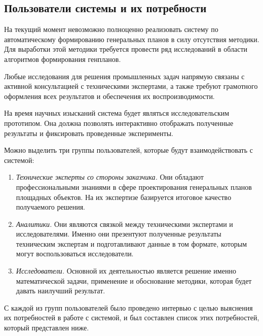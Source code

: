 \subsection{\Large{Пользователи системы и их потребности}}

На текущий момент невозможно полноценно реализовать систему по автоматическому
формированию генеральных планов в силу отсутствия методики.
Для выработки этой методики требуется провести ряд исследований в области
алгоритмов формирования генпланов.

Любые исследования для решения промышленных задач напрямую связаны с активной консультацией
с техническими экспертами,
а также требуют грамотного оформления всех результатов и обеспечения их воспроизводимости.

На время научных изысканий система будет являться исследовательским прототипом.
Она должна позволять интерактивно отображать полученные результаты и фиксировать проведенные эксперименты.

Можно выделить три группы пользователей, которые будут взаимодействовать с системой:
\begin{enumerate}
    \item {
        \textit{Технические эксперты со стороны заказчика.} Они обладают профессиональными знаниями в сфере
        проектирования генеральных планов площадных объектов. На их экспертизе базируется итоговое
        качество получаемого решения.
    }
    \item{
        \textit{Аналитики.} Они являются связкой между техническими экспертами и исследователями.
        Именно они презентуют полученные результаты техническим экспертам и подготавливают данные в том формате,
        которым могут воспользоваться исследователи.
    }
    \item{
        \textit{Исследователи.} Основной их деятельностью является решение именно математической задачи,
        применение и обоснование методики, которая будет давать наилучший результат.
    }
\end{enumerate}

С каждой из групп пользователей было проведено интервью с целью выяснения их потребностей в работе с системой,
и был составлен список этих потребностей, который представлен ниже.

